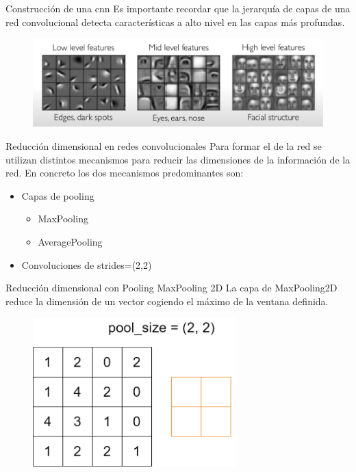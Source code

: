 \begin{frame}{Construcción de una \gls{cnn}}
Es importante recordar que la \alert{jerarquía} de capas de una red convolucional detecta características a \alert{alto nivel} en las capas \alert{más profundas}.

\begin{figure}
    \centering
    \includegraphics[width=\textwidth]{figures/Tema 3/ConvHierarchy_1.png}
    \caption{\cite{ConvHierarchy}}
\end{figure}
\end{frame}

\begin{frame}{Reducción dimensional en redes convolucionales}
Para formar el  de la red se utilizan distintos mecanismos para \alert{reducir las dimensiones} de la información de la red. En concreto los dos mecanismos predominantes son:
\begin{itemize}
    \item \alert{Capas de pooling}
    \begin{itemize}
        \item MaxPooling
        \item AveragePooling
    \end{itemize}
    \item \alert{Convoluciones de strides=(2,2)}
\end{itemize}
\end{frame}

\begin{frame}{Reducción dimensional con Pooling}
\alert{\Large MaxPooling 2D}
La capa de MaxPooling2D reduce la dimensión de un vector cogiendo el \alert{máximo} de la ventana definida.

\begin{figure}
    \centering
    \includegraphics[width=0.7\textwidth]{figures/Tema 3/MaxPooling_1.png}
\end{figure}
\end{frame}

